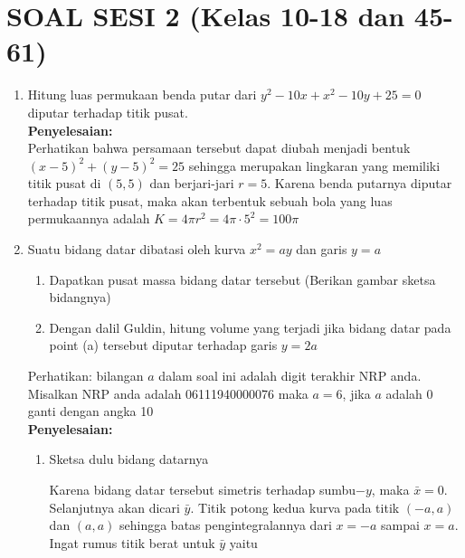 \documentclass{article}
\begin{document}
\section*{SOAL SESI 2 (Kelas 10-18 dan 45-61)}
\begin{enumerate}
	\item Hitung luas permukaan benda putar dari $y^2-10x+x^2-10y+25=0$ diputar terhadap titik pusat.\\
	\textbf{Penyelesaian:}\\
	Perhatikan bahwa persamaan tersebut dapat diubah menjadi bentuk $(x-5)^2+(y-5)^2=25$ sehingga merupakan lingkaran yang memiliki titik pusat di $(5,5)$ dan berjari-jari $r=5$. Karena benda putarnya diputar terhadap titik pusat, maka akan terbentuk sebuah bola yang luas permukaannya adalah $K=4\pi r^2=4\pi\cdot 5^2=100\pi$
	\item Suatu bidang datar dibatasi oleh kurva $x^2=ay$ dan garis $y=a$
	\begin{enumerate}
		\item Dapatkan pusat massa bidang datar tersebut (Berikan gambar sketsa bidangnya)
		\item Dengan dalil Guldin, hitung volume yang terjadi jika bidang datar pada point (a) tersebut diputar terhadap garis $y=2a$
	\end{enumerate}
	Perhatikan: bilangan $a$ dalam soal ini adalah digit terakhir NRP anda. Misalkan NRP anda adalah 06111940000076 maka $a=6$, jika $a$ adalah 0 ganti dengan angka 10\\
	\textbf{Penyelesaian:}
	\begin{enumerate}
		\item Sketsa dulu bidang datarnya
		\begin{center}
	\end{center}
	Karena bidang datar tersebut simetris terhadap sumbu$-y$, maka $\bar{x}=0$. \\
	Selanjutnya akan dicari $\bar{y}$. Titik potong kedua kurva pada titik $(-a,a)$ dan $(a,a)$ sehingga batas pengintegralannya dari $x=-a$	sampai $x=a$. Ingat rumus titik berat untuk $\bar{y}$ yaitu

\end{enumerate}
\end{enumerate}
\end{document}
